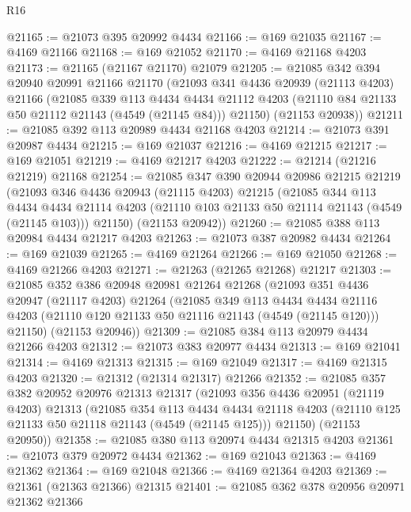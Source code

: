 \begin{lexlean}{R16}
\begin{coremodule}
@21165 := @21073 @395 @20992 @4434
@21166 := @169 @21035
@21167 := @4169 @21166
@21168 := @169 @21052
@21170 := @4169 @21168 @4203
@21173 := @21165 (@21167 @21170) @21079
@21205 := @21085
    @342
    @394
    @20940
    @20991
    @21166
    @21170
    (@21093
      @341
      @4436
      @20939
      (@21113 @4203)
      @21166
      (@21085
        @339
        @113
        @4434
        @4434
        @21112
        @4203
        (@21110 @84 @21133 @50 @21112 @21143 (@4549 (@21145 @84)))
        @21150)
      (@21153 @20938))
@21211 := @21085 @392 @113 @20989 @4434 @21168 @4203
@21214 := @21073 @391 @20987 @4434
@21215 := @169 @21037
@21216 := @4169 @21215
@21217 := @169 @21051
@21219 := @4169 @21217 @4203
@21222 := @21214 (@21216 @21219) @21168
@21254 := @21085
    @347
    @390
    @20944
    @20986
    @21215
    @21219
    (@21093
      @346
      @4436
      @20943
      (@21115 @4203)
      @21215
      (@21085
        @344
        @113
        @4434
        @4434
        @21114
        @4203
        (@21110 @103 @21133 @50 @21114 @21143 (@4549 (@21145 @103)))
        @21150)
      (@21153 @20942))
@21260 := @21085 @388 @113 @20984 @4434 @21217 @4203
@21263 := @21073 @387 @20982 @4434
@21264 := @169 @21039
@21265 := @4169 @21264
@21266 := @169 @21050
@21268 := @4169 @21266 @4203
@21271 := @21263 (@21265 @21268) @21217
@21303 := @21085
    @352
    @386
    @20948
    @20981
    @21264
    @21268
    (@21093
      @351
      @4436
      @20947
      (@21117 @4203)
      @21264
      (@21085
        @349
        @113
        @4434
        @4434
        @21116
        @4203
        (@21110 @120 @21133 @50 @21116 @21143 (@4549 (@21145 @120)))
        @21150)
      (@21153 @20946))
@21309 := @21085 @384 @113 @20979 @4434 @21266 @4203
@21312 := @21073 @383 @20977 @4434
@21313 := @169 @21041
@21314 := @4169 @21313
@21315 := @169 @21049
@21317 := @4169 @21315 @4203
@21320 := @21312 (@21314 @21317) @21266
@21352 := @21085
    @357
    @382
    @20952
    @20976
    @21313
    @21317
    (@21093
      @356
      @4436
      @20951
      (@21119 @4203)
      @21313
      (@21085
        @354
        @113
        @4434
        @4434
        @21118
        @4203
        (@21110 @125 @21133 @50 @21118 @21143 (@4549 (@21145 @125)))
        @21150)
      (@21153 @20950))
@21358 := @21085 @380 @113 @20974 @4434 @21315 @4203
@21361 := @21073 @379 @20972 @4434
@21362 := @169 @21043
@21363 := @4169 @21362
@21364 := @169 @21048
@21366 := @4169 @21364 @4203
@21369 := @21361 (@21363 @21366) @21315
@21401 := @21085
    @362
    @378
    @20956
    @20971
    @21362
    @21366

\end{coremodule}
\end{lexlean}
